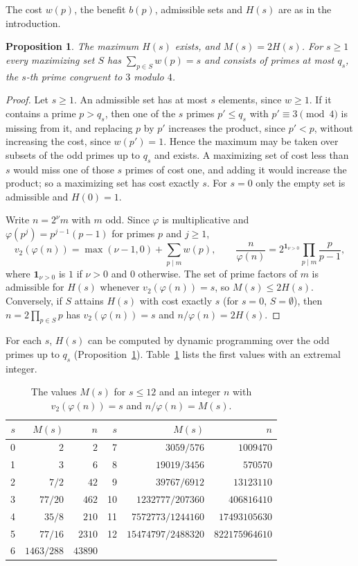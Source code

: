 \documentclass[11pt]{amsart}
\newtheorem{proposition}[theorem]{Proposition}
\theoremstyle{remark}
\numberwithin{equation}{section}
\begin{document}
The cost $w(p)$, the benefit $b(p)$, admissible sets and $H(s)$ are as
in the introduction.

\begin{proposition}\label{prop:reduction}
The maximum $H(s)$ exists, and $M(s)=2H(s)$. For $s\ge1$ every
maximizing set $S$ has $\sum_{p\in S}w(p)=s$ and consists of primes at
most $q_s$, the $s$-th prime congruent to $3$ modulo $4$.
\end{proposition}

\begin{proof}
Let $s\ge1$. An admissible set has at most $s$ elements, since $w\ge1$.
If it contains a prime $p>q_s$, then one of the $s$ primes $p'\le q_s$
with $p'\equiv3\pmod4$ is missing from it, and replacing $p$ by $p'$
increases the product, since $p'<p$, without increasing the cost, since
$w(p')=1$. Hence the maximum may be taken over subsets of the odd primes
up to $q_s$ and exists. A maximizing set of cost less than $s$ would miss
one of those $s$ primes of cost one, and adding it would increase the
product; so a maximizing set has cost exactly $s$. For $s=0$ only the empty
set is admissible and $H(0)=1$.

Write $n=2^\nu m$ with $m$ odd. Since $\varphi$ is multiplicative and
$\varphi(p^j)=p^{j-1}(p-1)$ for primes $p$ and $j\ge1$,
\[
v_2(\varphi(n))=\max(\nu-1,0)+\sum_{p\mid m}w(p),\qquad
\frac{n}{\varphi(n)}=2^{\mathbf 1_{\nu>0}}\prod_{p\mid m}\frac{p}{p-1},
\]
where $\mathbf 1_{\nu>0}$ is $1$ if $\nu>0$ and $0$ otherwise.
The set of prime factors of $m$ is admissible for $H(s)$ whenever
$v_2(\varphi(n))=s$, so $M(s)\le2H(s)$. Conversely, if $S$ attains $H(s)$
with cost exactly $s$ (for $s=0$, $S=\emptyset$), then
$n=2\prod_{p\in S}p$ has $v_2(\varphi(n))=s$ and $n/\varphi(n)=2H(s)$.
\end{proof}

For each $s$, $H(s)$ can be computed by dynamic programming over the
odd primes up to $q_s$ (Proposition~\ref{prop:reduction}).
Table~\ref{tab:values} lists the first values with an extremal integer.

\begin{table}[ht]
\centering
\begin{tabular}{rrr@{\qquad}rrr}
\toprule
$s$ & $M(s)$ & $n$ & $s$ & $M(s)$ & $n$\\
\midrule
0 & $2$ & $2$ & 7 & $3059/576$ & $1009470$\\
1 & $3$ & $6$ & 8 & $19019/3456$ & $570570$\\
2 & $7/2$ & $42$ & 9 & $39767/6912$ & $13123110$\\
3 & $77/20$ & $462$ & 10 & $1232777/207360$ & $406816410$\\
4 & $35/8$ & $210$ & 11 & $7572773/1244160$ & $17493105630$\\
5 & $77/16$ & $2310$ & 12 & $15474797/2488320$ & $822175964610$\\
6 & $1463/288$ & $43890$ & & &\\
\bottomrule
\end{tabular}
\caption{The values $M(s)$ for $s\le12$ and an integer $n$ with
$v_2(\varphi(n))=s$ and $n/\varphi(n)=M(s)$.}\label{tab:values}
\end{table}
\end{document}
